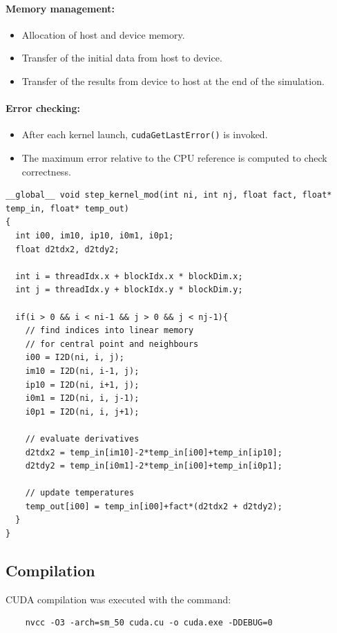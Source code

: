 \paragraph{Memory management:}
\begin{itemize}
    \item Allocation of host and device memory.
    \item Transfer of the initial data from host to device.
    \item Transfer of the results from device to host at the end of the simulation.
\end{itemize}

\paragraph{Error checking:}
\begin{itemize}
    \item After each kernel launch, \texttt{cudaGetLastError()} is invoked.
    \item The maximum error relative to the CPU reference is computed to check correctness.
\end{itemize}

\begin{lstlisting}
__global__ void step_kernel_mod(int ni, int nj, float fact, float* temp_in, float* temp_out)
{
  int i00, im10, ip10, i0m1, i0p1;
  float d2tdx2, d2tdy2;

  int i = threadIdx.x + blockIdx.x * blockDim.x;
  int j = threadIdx.y + blockIdx.y * blockDim.y;

  if(i > 0 && i < ni-1 && j > 0 && j < nj-1){
    // find indices into linear memory
    // for central point and neighbours
    i00 = I2D(ni, i, j);
    im10 = I2D(ni, i-1, j);
    ip10 = I2D(ni, i+1, j);
    i0m1 = I2D(ni, i, j-1);
    i0p1 = I2D(ni, i, j+1);

    // evaluate derivatives
    d2tdx2 = temp_in[im10]-2*temp_in[i00]+temp_in[ip10];
    d2tdy2 = temp_in[i0m1]-2*temp_in[i00]+temp_in[i0p1];

    // update temperatures
    temp_out[i00] = temp_in[i00]+fact*(d2tdx2 + d2tdy2);
  }
}
\end{lstlisting}

\subsection{Compilation}
CUDA compilation was executed with the command:

\begin{verbatim}
    nvcc -O3 -arch=sm_50 cuda.cu -o cuda.exe -DDEBUG=0
\end{verbatim}

